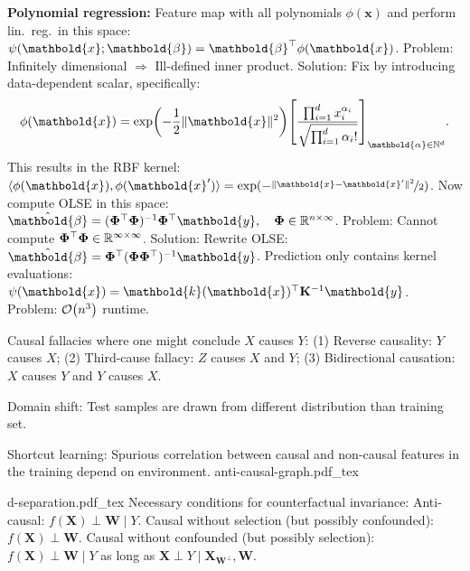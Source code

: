 \documentclass[9pt]{extarticle}
\newcommand{\incfig}[1]{
    \def\svgwidth{\columnwidth}
    {#1.pdf_tex}
}
\newenvironment{topic}[1]
{\textbf{\sffamily \colorbox{black}{\rlap{\textbf{\textcolor{white}{#1}}}\hspace{\linewidth}\hspace{-2\fboxsep}}}}
{}
\newenvironment{subtopic}[1]
{\textbf{\sffamily #1:}}
{}
\renewcommand{\mat}[1]{\ensuremath{\mathbf{#1}}}
\renewcommand{\vec}[1]{\ensuremath{\mathbold{#1}}}
\begin{document}
\begin{multicols*}{3}
\begin{topic}{Regression}
        \begin{subtopic}{Polynomial regression}
            Feature map with all polynomials $\phi(\vec{x})$ and perform lin.\ reg.\ in this space: $\psi(\vec{x}; \vec{\beta}) = \transpose{\vec{\beta}} \phi(\vec{x})$.
            Problem: Infinitely dimensional $\Rightarrow$ Ill-defined inner product. Solution: Fix by
            introducing data-dependent scalar, specifically: \[
                \phi(\vec{x}) = \exp \lft( -\frac{1}{2} \| \vec{x} \|^2 \rgt) \lft[ \frac{\prod_{i=1}^d x_i^{\alpha_i}}{\sqrt{\prod_{i=1}^d \alpha_i!}} \rgt]_{\vec{\alpha} \in \mathbb{N}^d}.
            \]
            This results in the RBF kernel: $\langle \phi(\vec{x}), \phi(\vec{x}') \rangle = \exp (
                -\nicefrac{\| \vec{x} - \vec{x}' \|^2}{2} )$. Now compute OLSE in this space: $\hat{\vec{\beta}} =
                \inv{(\transpose{\mat{\Phi}} \mat{\Phi})} \transpose{\mat{\Phi}} \vec{y}, \quad \mat{\Phi} \in
                \R^{n \times \infty}$. Problem: Cannot compute $\transpose{\mat{\Phi}} \mat{\Phi} \in \R^{\infty
                    \times \infty}$. Solution: Rewrite OLSE: $\hat{\vec{\beta}} = \transpose{\mat{\Phi}}
                \inv{(\mat{\Phi} \transpose{\mat{\Phi}})} \vec{y}$. Prediction only contains kernel evaluations:
            $\psi(\vec{x}) = \transpose{\vec{k}(\vec{x})} \inv{\mat{K}} \vec{y}$. Problem: $\bigo{n^3}$
            runtime.

        \end{subtopic}

    \end{topic}

    \begin{topic}{Causality}
        Causal fallacies where one might conclude $X$ causes $Y$: (1) Reverse causality: $Y$ causes $X$;
        (2) Third-cause fallacy: $Z$ causes $X$ and $Y$; (3) Bidirectional causation: $X$ causes $Y$ and
        $Y$ causes $X$.

        Domain shift: Test samples are drawn from different distribution than training set.

        Shortcut learning: Spurious correlation between causal and non-causal features in the training
        depend on environment. \incfig{anti-causal-graph} \incfig{d-separation} Necessary conditions for
        counterfactual invariance: Anti-causal: $f(\mat{X}) \perp \mat{W} \mid Y$. Causal without selection
        (but possibly confounded): $f(\mat{X}) \perp \mat{W}$. Causal without confounded (but possibly
        selection): $f(\mat{X}) \perp \mat{W} \mid Y$ as long as $\mat{X} \perp Y \mid
            \mat{X}_{\mat{W}^{\perp}}, \mat{W}$.


\end{topic}
\end{multicols*}
\end{document}
